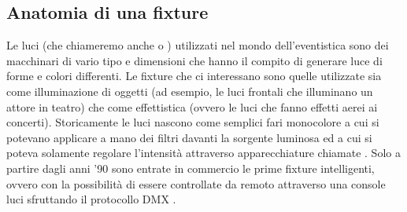 \documentclass[main.tex]{subfiles}
\begin{document}
\subsection{Anatomia di una fixture}\label{subsec:1_fixtureAnatomy}
Le luci (che chiameremo anche  o ) utilizzati nel mondo dell'eventistica sono dei macchinari di vario tipo e dimensioni che hanno il compito di generare luce di forme e colori differenti. Le fixture che ci interessano sono quelle utilizzate sia come illuminazione di oggetti (ad esempio, le luci frontali che illuminano un attore in teatro) che come effettistica (ovvero le luci che fanno effetti aerei ai concerti). Storicamente le luci nascono come semplici fari monocolore a cui si potevano applicare a mano dei filtri davanti la sorgente luminosa ed a cui si poteva solamente regolare l'intensità attraverso apparecchiature chiamate . Solo a partire dagli anni '90 sono entrate in commercio le prime fixture intelligenti, ovvero con la possibilità di essere controllate da remoto attraverso una console luci sfruttando il protocollo DMX \cite{DMX}. 
\end{document}
